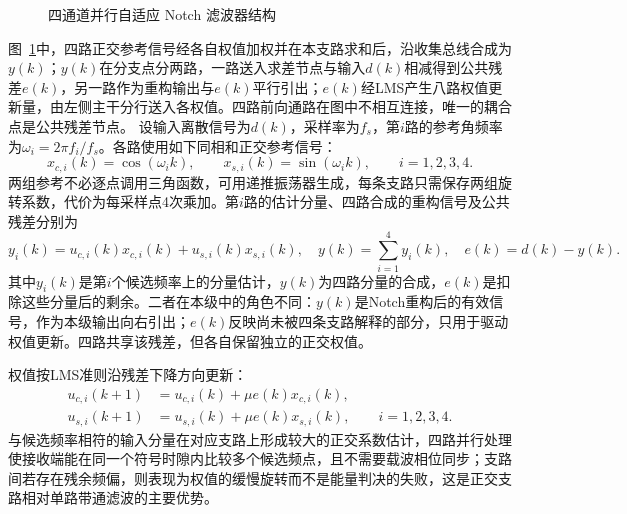 \begin{figure}[htbp]
 \centering
 \begin{tikzpicture}[x=1cm,y=1cm]
  
 \end{tikzpicture}
 \caption[四通道并行自适应Notch滤波器结构]{四通道并行自适应 Notch 滤波器结构}
 \label{fig:chap03_four_channel_notch}
\end{figure}

图~\ref{fig:chap03_four_channel_notch}中，四路正交参考信号经各自权值加权并在本支路求和后，沿收集总线合成为$y(k)$；$y(k)$在分支点分两路，一路送入求差节点与输入$d(k)$相减得到公共残差$e(k)$，另一路作为重构输出与$e(k)$平行引出；$e(k)$经LMS产生八路权值更新量，由左侧主干分行送入各权值。四路前向通路在图中不相互连接，唯一的耦合点是公共残差节点。
设输入离散信号为$d(k)$，采样率为$f_s$，第$i$路的参考角频率为$\omega_i=2\pi f_i/f_s$。各路使用如下同相和正交参考信号：
\begin{equation}
x_{c,i}(k)=\cos(\omega_i k),\qquad
x_{s,i}(k)=\sin(\omega_i k),\qquad i=1,2,3,4.
\label{eq:chap03_notch_references}
\end{equation}
两组参考不必逐点调用三角函数，可用递推振荡器生成，每条支路只需保存两组旋转系数，代价为每采样点4次乘加。第$i$路的估计分量、四路合成的重构信号及公共残差分别为
\begin{equation}
y_i(k)=u_{c,i}(k)x_{c,i}(k)+u_{s,i}(k)x_{s,i}(k),\quad
y(k)=\sum_{i=1}^{4}y_i(k),\quad e(k)=d(k)-y(k).
\label{eq:chap03_notch}
\end{equation}
其中$y_i(k)$是第$i$个候选频率上的分量估计，$y(k)$为四路分量的合成，$e(k)$是扣除这些分量后的剩余。二者在本级中的角色不同：$y(k)$是Notch重构后的有效信号，作为本级输出向右引出；$e(k)$反映尚未被四条支路解释的部分，只用于驱动权值更新。四路共享该残差，但各自保留独立的正交权值。

权值按LMS准则沿残差下降方向更新：
\begin{equation}
\begin{aligned}
u_{c,i}(k+1)&=u_{c,i}(k)+\mu e(k)x_{c,i}(k),\\
u_{s,i}(k+1)&=u_{s,i}(k)+\mu e(k)x_{s,i}(k),\qquad i=1,2,3,4.
\end{aligned}
\label{eq:chap03_lms}
\end{equation}
与候选频率相符的输入分量在对应支路上形成较大的正交系数估计，四路并行处理使接收端能在同一个符号时隙内比较多个候选频点，且不需要载波相位同步；支路间若存在残余频偏，则表现为权值的缓慢旋转而不是能量判决的失败，这是正交支路相对单路带通滤波的主要优势。

